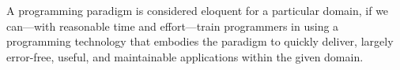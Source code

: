 






\begin{definition}[Eloquence]

\label{def:eloquence}

A programming paradigm is considered eloquent for a particular domain,
if we can---with reasonable time and effort---train programmers in
using a programming technology that embodies the paradigm to quickly
deliver, largely error-free, useful, and maintainable applications
within the given domain.

\end{definition}

